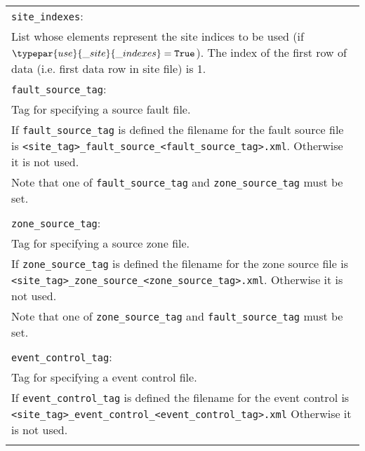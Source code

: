 \vspace{2em}
\begin{tabular}{|p{\textwidth}|}
\hline \vspace{0.1em} \texttt{site\_indexes}: \\
List whose elements represent the site
 indices to be used (if $\typepar{use}{\_site}{\_indexes}=\texttt{True}$). The
 index of the first row of data  (i.e. first data row in site file) is 1.\\
\hline \vspace{0.1em} \texttt{fault\_source\_tag}: \\
Tag for specifying a source fault file. \\
If  \texttt{fault\_source\_tag} is defined the
filename for the fault source file is
\texttt{<site\_tag>\_fault\_source\_<fault\_source\_tag>.xml}.
Otherwise it is not used. \\
Note that one of \texttt{fault\_source\_tag} and \texttt{zone\_source\_tag} must
be set. \\
\\
\hline \vspace{0.1em} \texttt{zone\_source\_tag}: \\
Tag for specifying a source zone file. \\
If  \texttt{zone\_source\_tag} is defined the
filename for the zone source file is
\texttt{<site\_tag>\_zone\_source\_<zone\_source\_tag>.xml}.
Otherwise it is not used. \\
Note that one of \texttt{zone\_source\_tag} and \texttt{fault\_source\_tag} must
be set. \\
\\
\hline \vspace{0.1em} \texttt{event\_control\_tag}: \\
Tag for specifying a event control file. \\
If  \texttt{event\_control\_tag} is defined the
filename for the event control is
\texttt{<site\_tag>\_}\texttt{event\_control\_}\texttt{<event\_control\_tag>}\texttt{.xml}
Otherwise it is not used. \\
\\
\hline
 \end{tabular}

